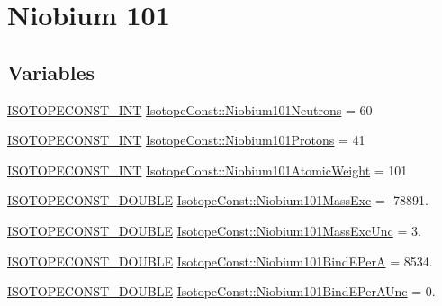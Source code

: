 \hypertarget{group___isotope_const-_niobium-_nb101}{}\section{Niobium 101}
\label{group___isotope_const-_niobium-_nb101}
\subsection*{Variables}
\begin{DoxyCompactItemize}
\item 
\mbox{\hyperlink{group___isotope_const-_macros_ga5f18360b3e99483a35c32d789e62621c}{I\+S\+O\+T\+O\+P\+E\+C\+O\+N\+S\+T\+\_\+\+I\+NT}} \mbox{\hyperlink{group___isotope_const-_niobium-_nb101_ga9ff450a133b25c72f46080b731c1b041}{Isotope\+Const\+::\+Niobium101\+Neutrons}} = 60
\item 
\mbox{\hyperlink{group___isotope_const-_macros_ga5f18360b3e99483a35c32d789e62621c}{I\+S\+O\+T\+O\+P\+E\+C\+O\+N\+S\+T\+\_\+\+I\+NT}} \mbox{\hyperlink{group___isotope_const-_niobium-_nb101_ga4daccecf5273747f915fb04b9c642fd0}{Isotope\+Const\+::\+Niobium101\+Protons}} = 41
\item 
\mbox{\hyperlink{group___isotope_const-_macros_ga5f18360b3e99483a35c32d789e62621c}{I\+S\+O\+T\+O\+P\+E\+C\+O\+N\+S\+T\+\_\+\+I\+NT}} \mbox{\hyperlink{group___isotope_const-_niobium-_nb101_ga790b311bf82951845d69d5a2b7cd77cf}{Isotope\+Const\+::\+Niobium101\+Atomic\+Weight}} = 101
\item 
\mbox{\hyperlink{group___isotope_const-_macros_ga8f45a7272ce02c0b4c65c44636ed719a}{I\+S\+O\+T\+O\+P\+E\+C\+O\+N\+S\+T\+\_\+\+D\+O\+U\+B\+LE}} \mbox{\hyperlink{group___isotope_const-_niobium-_nb101_ga785c3f13fa7bc0a9de51c4c062a6fa87}{Isotope\+Const\+::\+Niobium101\+Mass\+Exc}} = -\/78891.
\item 
\mbox{\hyperlink{group___isotope_const-_macros_ga8f45a7272ce02c0b4c65c44636ed719a}{I\+S\+O\+T\+O\+P\+E\+C\+O\+N\+S\+T\+\_\+\+D\+O\+U\+B\+LE}} \mbox{\hyperlink{group___isotope_const-_niobium-_nb101_gae2625449338bddaa04713c09577c462a}{Isotope\+Const\+::\+Niobium101\+Mass\+Exc\+Unc}} = 3.
\item 
\mbox{\hyperlink{group___isotope_const-_macros_ga8f45a7272ce02c0b4c65c44636ed719a}{I\+S\+O\+T\+O\+P\+E\+C\+O\+N\+S\+T\+\_\+\+D\+O\+U\+B\+LE}} \mbox{\hyperlink{group___isotope_const-_niobium-_nb101_gab45f0d6be6c830a241f27c264ebce0d3}{Isotope\+Const\+::\+Niobium101\+Bind\+E\+PerA}} = 8534.
\item 
\mbox{\hyperlink{group___isotope_const-_macros_ga8f45a7272ce02c0b4c65c44636ed719a}{I\+S\+O\+T\+O\+P\+E\+C\+O\+N\+S\+T\+\_\+\+D\+O\+U\+B\+LE}} \mbox{\hyperlink{group___isotope_const-_niobium-_nb101_ga3e1ae3850251a498f11116433d9fd00b}{Isotope\+Const\+::\+Niobium101\+Bind\+E\+Per\+A\+Unc}} = 0.

\end{DoxyCompactItemize}
